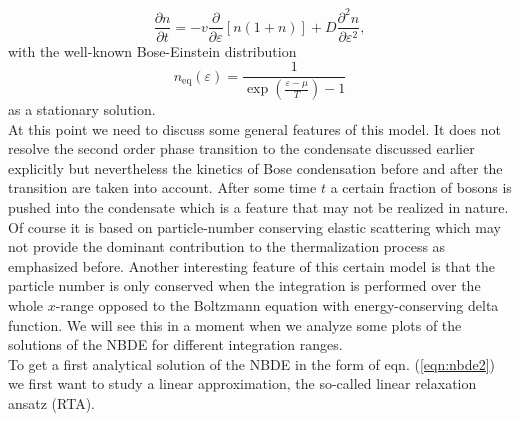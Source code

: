 \begin{equation}
			\frac{\partial n}{\partial t} = -v\frac{\partial}{\partial\varepsilon}\left[n(1+n)\right] + D\frac{\partial^2 n}{\partial\varepsilon^2}\label{eqn:nbde2},
		\end{equation}
with the well-known Bose-Einstein distribution		
\begin{equation}
	n_{\mathrm{eq}}(\varepsilon) = \frac{1}{\exp(\frac{\varepsilon-\mu}{T}) - 1}
\end{equation}
as a stationary solution.\\
At this point we need to discuss some general features of this model. It does not resolve the second order phase transition to the condensate discussed earlier explicitly but nevertheless the kinetics of Bose condensation before and after the transition are taken into account. After some time $t$ a certain fraction of bosons is pushed into the condensate which is a feature that may not be realized in nature. Of course it is based on particle-number conserving elastic scattering which may not provide the dominant contribution to the thermalization process as emphasized before. Another interesting feature of this certain model is that the particle number is only conserved when the integration is performed over the whole $x$-range opposed to the Boltzmann equation with energy-conserving delta function. We will see this in a moment when we analyze some plots of the solutions of the NBDE for different integration ranges. \\
To get a first analytical solution of the NBDE in the form of eqn. (\ref{eqn:nbde2}) we first want to study a linear approximation, the so-called linear relaxation ansatz (RTA).
